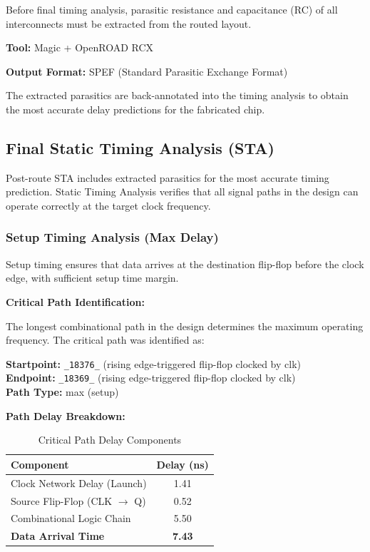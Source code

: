 \documentclass[12pt,a4paper]{article}
\begin{document}
Before final timing analysis, parasitic resistance and capacitance (RC) of all interconnects must be extracted from the routed layout.

\textbf{Tool:} Magic + OpenROAD RCX

\textbf{Output Format:} SPEF (Standard Parasitic Exchange Format)

The extracted parasitics are back-annotated into the timing analysis to obtain the most accurate delay predictions for the fabricated chip.

\subsection{Final Static Timing Analysis (STA)}

Post-route STA includes extracted parasitics for the most accurate timing prediction. Static Timing Analysis verifies that all signal paths in the design can operate correctly at the target clock frequency.

\subsubsection{Setup Timing Analysis (Max Delay)}

Setup timing ensures that data arrives at the destination flip-flop before the clock edge, with sufficient setup time margin.

\textbf{Critical Path Identification:}

The longest combinational path in the design determines the maximum operating frequency. The critical path was identified as:

\begin{tcolorbox}[colback=gray!5,colframe=black,title=Critical Path (Setup)]
\textbf{Startpoint:} \texttt{\_18376\_} (rising edge-triggered flip-flop clocked by clk)\\
\textbf{Endpoint:} \texttt{\_18369\_} (rising edge-triggered flip-flop clocked by clk)\\
\textbf{Path Type:} max (setup)
\end{tcolorbox}

\textbf{Path Delay Breakdown:}

\begin{table}[H]
\centering
\caption{Critical Path Delay Components}
\label{tab:critical_path}
\begin{tabular}{@{}lc@{}}
\toprule
\textbf{Component} & \textbf{Delay (ns)} \\
\midrule
Clock Network Delay (Launch) & 1.41 \\
Source Flip-Flop (CLK $\rightarrow$ Q) & 0.52 \\
Combinational Logic Chain & 5.50 \\
\midrule
\textbf{Data Arrival Time} & \textbf{7.43} \\
\bottomrule
\end{tabular}
\end{table}
\end{document}
